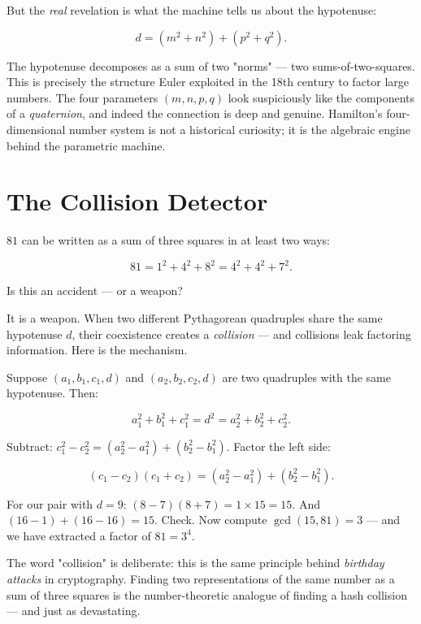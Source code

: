 \documentclass[11pt,twoside,openright]{book}
\theoremstyle{definition}
\theoremstyle{remark}
\begin{document}
But the \textit{real} revelation is what the machine tells us about the hypotenuse:

\[d = (m^2 + n^2) + (p^2 + q^2).\]

The hypotenuse decomposes as a sum of two "norms" --- two sums-of-two-squares. This is precisely the structure Euler exploited in the 18th century to factor large numbers. The four parameters $(m, n, p, q)$ look suspiciously like the components of a \textit{quaternion}, and indeed the connection is deep and genuine. Hamilton's four-dimensional number system is not a historical curiosity; it is the algebraic engine behind the parametric machine.




\section{The Collision Detector}

$81$ can be written as a sum of three squares in at least two ways:

\[81 = 1^2 + 4^2 + 8^2 = 4^2 + 4^2 + 7^2.\]

Is this an accident --- or a weapon?

It is a weapon. When two different Pythagorean quadruples share the same hypotenuse $d$, their coexistence creates a \textit{collision} --- and collisions leak factoring information. Here is the mechanism.

Suppose $(a_1, b_1, c_1, d)$ and $(a_2, b_2, c_2, d)$ are two quadruples with the same hypotenuse. Then:

\[a_1^2 + b_1^2 + c_1^2 = d^2 = a_2^2 + b_2^2 + c_2^2.\]

Subtract: $c_1^2 - c_2^2 = (a_2^2 - a_1^2) + (b_2^2 - b_1^2)$. Factor the left side:

\[(c_1 - c_2)(c_1 + c_2) = (a_2^2 - a_1^2) + (b_2^2 - b_1^2).\]

For our pair with $d = 9$: $(8 - 7)(8 + 7) = 1 \times 15 = 15$. And $(16 - 1) + (16 - 16) = 15$. Check. Now compute $\gcd(15, 81) = 3$ --- and we have extracted a factor of $81 = 3^4$.

The word "collision" is deliberate: this is the same principle behind \textit{birthday attacks} in cryptography. Finding two representations of the same number as a sum of three squares is the number-theoretic analogue of finding a hash collision --- and just as devastating.
\end{document}
